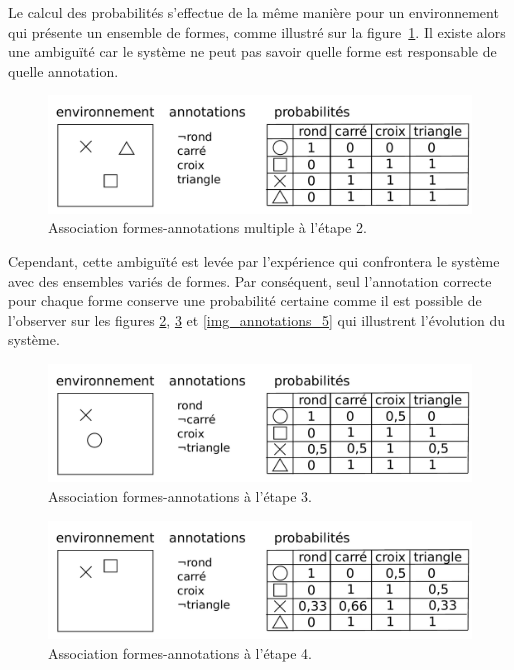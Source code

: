Le calcul des probabilités s'effectue de la même manière pour un environnement qui présente un ensemble de formes, comme illustré sur la figure~\ref{img_annotations_2}. Il existe alors une ambiguïté car le système ne peut pas savoir quelle forme est responsable de quelle annotation.  

\begin{figure}[H] 
\includegraphics[width=\textwidth]{files/raisonneur/annotations_2} 
\caption{Association formes-annotations multiple à l'étape 2.} 
\label{img_annotations_2}
\end{figure}

Cependant, cette ambiguïté est levée par l'expérience qui confrontera le système avec des ensembles variés de formes. Par conséquent, seul l'annotation correcte pour chaque forme conserve une probabilité certaine comme il est possible de l'observer sur les figures \ref{img_annotations_3}, \ref{img_annotations_4} et \ref{img_annotations_5} qui illustrent l'évolution du système. 

\begin{figure}[H] 
\includegraphics[width=\textwidth]{files/raisonneur/annotations_3} 
\caption{Association formes-annotations à l'étape 3.} 
\label{img_annotations_3}
\end{figure}

\begin{figure}[H] 
\includegraphics[width=\textwidth]{files/raisonneur/annotations_4} 
\caption{Association formes-annotations à l'étape 4.} 
\label{img_annotations_4}
\end{figure}

